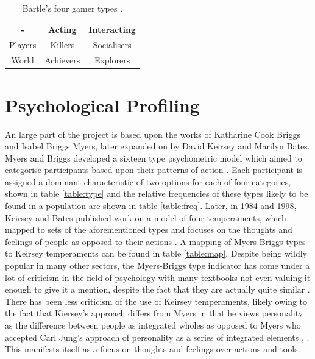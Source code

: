 \documentclass[12pt,a4paper,twoside]{report}
\begin{document}
\begin{table}
\begin{center}
\begin{tabular}{|c|c|c|}
	\hline - & Acting & Interacting \\ 
	\hline Players & Killers & Socialisers \\ 
	\hline World & Achievers & Explorers \\ 
	\hline 
\end{tabular}
\end{center}
\caption{Bartle's four gamer types \cite{bartle1996hearts}.}
\label{table:cards}
\end{table}

\section{Psychological Profiling}

An large part of the project is based upon the works of Katharine Cook Briggs and Isabel Briggs Myers, later expanded on by David Keirsey and Marilyn Bates. Myers and Briggs developed a sixteen type psychometric model which aimed to categorise participants based upon their patterns of action \cite{myers1995gifts}. Each participant is assigned a dominant characteristic of two options for each of four categories, shown in table \ref{table:type} and the relative frequencies of these types likely to be found in a population are shown in table \ref{table:freq}. Later, in 1984 and 1998, Keirsey and Bates published work on a model of four temperaments, which mapped to sets of the aforementioned types and focuses on the thoughts and feelings of people as opposed to their actions \cite{keirsey1998please} \cite{keirsey1984}. A mapping of Myers-Briggs types to Keirsey temperaments can be found in table \ref{table:map}. Despite being wildly popular in many other sectors, the Myers-Briggs type indicator has come under a lot of criticism in the field of psychology with many textbooks not even valuing it enough to give it a mention, despite the fact that they are actually quite similar \cite{lloyd2012myers}. There has been less criticism of the use of Keirsey temperaments, likely owing to the fact that Kiersey's approach differs from Myers in that he views personality as the difference between people as integrated wholes as opposed to Myers who accepted Carl Jung's approach of personality as a series of integrated elements \cite{jung1923psychological}, \cite{keirsey1998please}. This manifests itself as a focus on thoughts and feelings over actions and tools.
\end{document}
